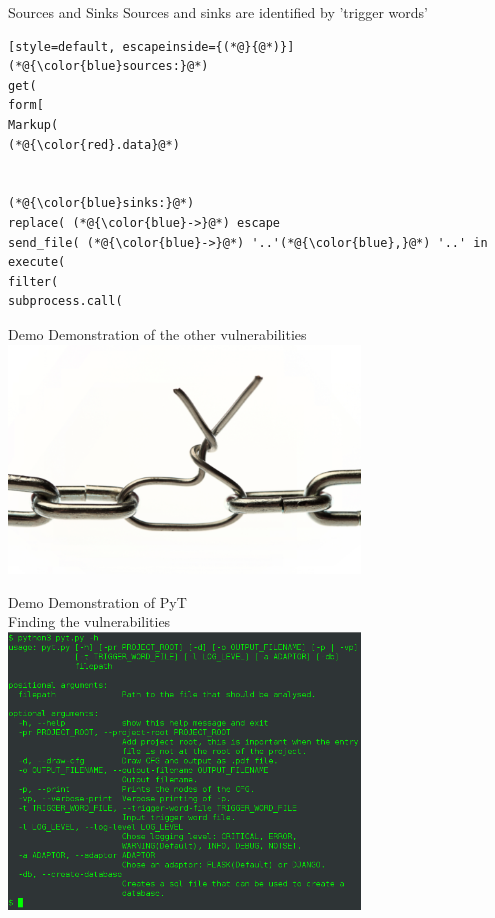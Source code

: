 \begin{frame}[fragile]{Sources and Sinks}
  Sources and sinks are identified by 'trigger words'
  \begin{lstlisting}[style=default, escapeinside={(*@}{@*)}]
(*@{\color{blue}sources:}@*)
get(
form[
Markup(
(*@{\color{red}.data}@*)


(*@{\color{blue}sinks:}@*)
replace( (*@{\color{blue}->}@*) escape
send_file( (*@{\color{blue}->}@*) '..'(*@{\color{blue},}@*) '..' in
execute(
filter(
subprocess.call(
\end{lstlisting}

\end{frame}

\begin{frame}{Demo}
  \centering
    Demonstration of the other vulnerabilities
    \includegraphics[width=0.7\textwidth]{graphics/vulnerability}
\end{frame}


\begin{frame}{Demo}
  \centering
  Demonstration of PyT \\
  Finding the vulnerabilities
    \includegraphics[width=0.7\textwidth]{graphics/pyt_overview.png}
\end{frame}

